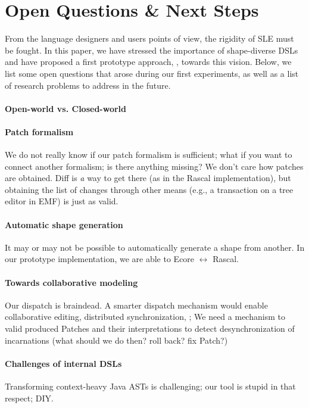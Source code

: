\section{Open Questions \& Next Steps}
\label{sec:discussion}
From the language designers and users points of view, the rigidity of SLE must be fought.
In this paper, we have stressed the importance of shape-diverse DSLs and have proposed a first prototype approach, \prism, towards this vision.
Below, we list some open questions that arose during our first experiments, as well as a list of research problems to address in the future.

\paragraph{Open-world vs. Closed-world}

\paragraph{Patch formalism}
We do not really know if our patch formalism is sufficient; what if you want to connect another formalism; is there anything missing?
We don’t care how patches are obtained. Diff is \emph{a} way to get there (as in the Rascal implementation), but obtaining the list of changes through other means (e.g., a transaction on a tree editor in EMF) is just as valid.

\paragraph{Automatic shape generation}
It may or may not be possible to automatically generate a shape from another.
In our prototype implementation, we are able to Ecore $\leftrightarrow$ Rascal.

\paragraph{Towards collaborative modeling}
Our dispatch is braindead. A smarter dispatch mechanism would enable collaborative editing, distributed synchronization, \etc;
We need a mechanism to valid produced Patches and their interpretations to detect desynchronization of incarnations (what should we do then? roll back? fix Patch?)

\paragraph{Challenges of internal DSLs}
Transforming context-heavy Java ASTs is challenging; our tool is stupid in that respect; DIY.

